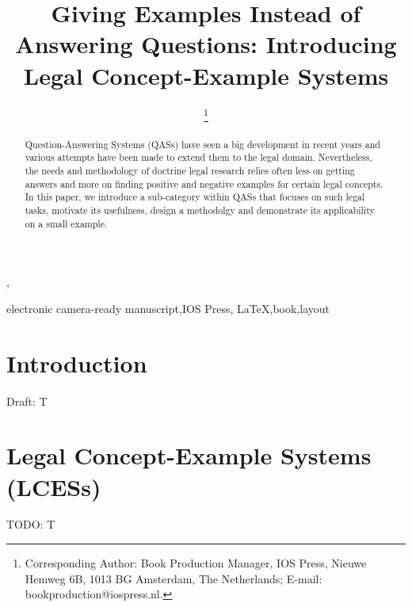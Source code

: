 \documentclass{IOS-Book-Article}
\begin{document}
\begin{frontmatter}              %

\title{Giving Examples Instead of Answering Questions: Introducing Legal Concept-Example Systems}

\author[A]{ %
\thanks{Corresponding Author: Book Production Manager, IOS Press, Nieuwe Hemweg 6B,
1013 BG Amsterdam, The Netherlands; E-mail:
bookproduction@iospress.nl.}},
\author[B]{ }

\address[A]{Book Production Department, IOS Press, The Netherlands}
\address[B]{Computer Science Institute, AGH University of Krakow, Poland}

\begin{abstract}
Question-Answering Systems (QASs) have seen a big development in recent years and various attempts have been made to extend them to the legal domain. Nevertheless, the needs and methodology of doctrine legal research relies often less on getting answers and more on finding positive and negative examples for certain legal concepts. In this paper, we introduce a sub-category within QASs that focuses on such legal tasks, motivate its usefulness, design a methodolgy and demonstrate its applicability on a small example.
\end{abstract}

\begin{keyword}
electronic camera-ready manuscript\sep IOS Press\sep
\LaTeX\sep book\sep layout
\end{keyword}
\end{frontmatter}

\thispagestyle{empty}
\pagestyle{empty}

\section{Introduction}

Draft: T



\section{Legal Concept-Example Systems (LCESs)}
\label{sec:lces}

TODO: T


\end{document}

